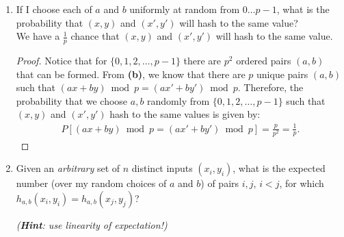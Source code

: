 \documentclass[11pt]{article}
\begin{document}
\begin{enumerate}
\begin{enumerate}
\begin{proof}
\begin{enumerate}
Let $x-x'=q$ and $y-y'=r$.  In this case, we have:
\begin{align*}
a(x-x')+b(y-y') =& \\
a(q)+b(r)=& 0 \bmod p
\end{align*}
By the hint in \textbf{(a)}, we know that because $q,r \neq 0$ are fixed, the equation $aq = z\bmod p$ has exactly one solution for every element $z\in \mathbb{Z}_p$.  Similarly, for every $z \in \mathbb{Z}_p$, there exists exactly one $-z \in \mathbb{Z}_p$ such that $-z + z =0$.  Therefore, as $a$ is allowed to vary, over the entire set, $b$ must be chosen uniquely such that $aq+br = 0 \bmod p$ holds.  Because there are $p$ possible choices for $a$ (i.e. every element in $\mathbb{Z}_p$), there are $p$ unique combinations $(a,b)$ such that $(ax+by) \bmod p = (ax'+by') \bmod p$. 
\end{enumerate}
\end{proof}
\item
If I choose each of $a$ and $b$ uniformly at random from $0 \ldots p-1$,
what is the probability that $(x,y)$ and $(x',y')$ will hash to the same value?  
\\
We have a $\frac{1}{p}$ chance that $(x,y)$ and $(x',y')$ will hash to the same value.
\begin{proof}
Notice that for $\{0,1,2,\ldots,p-1\}$ there are $p^2$ ordered pairs $(a,b)$ that can be formed.  From \textbf{(b)}, we know that there are $p$ unique pairs $(a,b)$ such that $(ax+by)\bmod p = (ax'+by') \bmod p$.  Therefore, the probability that we choose $a,b$ randomly from $\{0,1,2,\ldots,p-1\}$ such that $(x,y)$ and $(x',y')$ hash to the same values is given by:
\begin{align*}
P[(ax+by)\bmod p = (ax'+by')\bmod p] = \frac{p}{p^2} = \frac{1}{p}.
\end{align*}
\end{proof}
\item
Given an \emph{arbitrary} set of $n$ distinct inputs $(x_i, y_i)$,
what is the expected number (over my random choices of $a$ and $b$)
of pairs $i, j$, $i < j$, for which $h_{a,b}(x_i, y_i) = h_{a,b}(x_j,y_j)$?

\textit{(\textbf{Hint}: use linearity of expectation!)}


\end{enumerate}
\end{enumerate}
\end{document}
